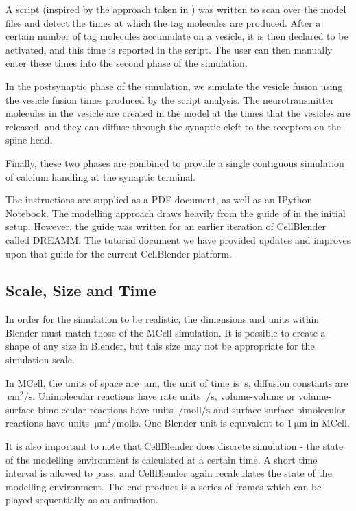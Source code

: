 \documentclass[a4paper]{article}
\begin{document}
A script (inspired by the approach taken in \cite{ma2014quantitative}) was written to scan over the model files and detect the times at which the tag molecules are produced. After a certain number of tag molecules accumulate on a vesicle, it is then declared to be activated, and this time is reported in the script. The user can then manually enter these times into the second phase of the simulation.

In the postsynaptic phase of the simulation, we simulate the vesicle fusion using the vesicle fusion times produced by the script analysis. The neurotransmitter molecules in the vesicle are created in the model at the times that the vesicles are released, and they can diffuse through the synaptic cleft to the receptors on the spine head.

Finally, these two phases are combined to provide a single contiguous simulation of calcium handling at the synaptic terminal.

The instructions are supplied as a PDF document, as well as an IPython Notebook. The modelling approach draws heavily from the guide of \cite{Czech:MethodsMolBiol:2009} in the initial setup. However, the guide was written for an earlier iteration of CellBlender called DREAMM. The tutorial document we have provided updates and improves upon that guide for the current CellBlender platform.

\subsection{Scale, Size and Time}
In order for the simulation to be realistic, the dimensions and units within Blender must match those of the MCell simulation. It is possible to create a shape of any size in Blender, but this size may not be appropriate for the simulation scale.

In MCell, the units of space are $\SI{}{\micro\metre}$, the unit of time is $\SI{}{\second}$, diffusion constants are $\SI{}{\centi\metre\squared\per\second}$. Unimolecular reactions have rate units $\SI{}{\per\second}$, volume-volume or volume-surface bimolecular reactions have units $\SI{}{\per\mole\litre\per\second}$ and surface-surface bimolecular reactions have units $\SI{}{\micro\metre\squared\per\mole\litre\second}$. One Blender unit is equivalent to $\SI{1}{\micro\metre}$ in MCell. 

It is also important to note that CellBlender does discrete simulation - the state of the modelling environment is calculated at a certain time. A short time interval is allowed to pass, and CellBlender again recalculates the state of the modelling environment. The end product is a series of frames which can be played sequentially as an animation.
\end{document}
